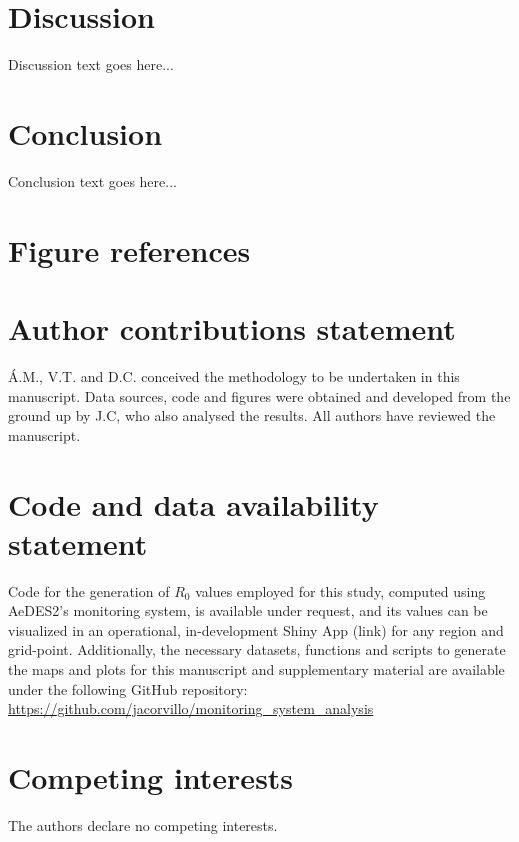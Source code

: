 \documentclass[article,10pt,twocolumn]{wlscirep}
\begin{document}
  \section{Discussion}

  Discussion text goes here...

  \section{Conclusion}

  Conclusion text goes here...

% 

\section*{Figure references}

\section*{Author contributions statement}

Á.M., V.T. and D.C. conceived the methodology to be undertaken in this manuscript. Data sources, code and figures were obtained and developed from the ground up by J.C, who also analysed the results. All authors have reviewed the manuscript. 

\section*{Code and data availability statement}
    Code for the generation of $R_0$ values employed for this study, computed using AeDES2's monitoring system, is available under request, and its values can be visualized in an operational, in-development Shiny App (link) for any region and grid-point. Additionally, the necessary datasets, functions and scripts to generate the maps and plots for this manuscript and supplementary material are available under the following GitHub repository: \url{https://github.com/jacorvillo/monitoring_system_analysis}
\section*{Competing interests}
    The authors declare no competing interests.
\end{document}
